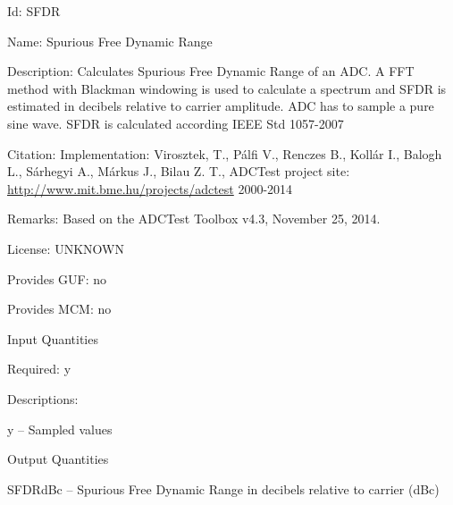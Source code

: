 \begin{tightdesc}
\item [Id:] SFDR
\item [Name:] Spurious Free Dynamic Range
\item [Description:] Calculates Spurious Free Dynamic Range of an ADC. A FFT method with Blackman windowing is used to calculate a spectrum and SFDR is estimated in decibels relative to carrier amplitude. ADC has to sample a pure sine wave. SFDR is calculated according IEEE Std 1057-2007
\item [Citation:] Implementation: Virosztek, T., Pálfi V., Renczes B., Kollár I., Balogh L., Sárhegyi A., Márkus J., Bilau Z. T., ADCTest project site: \url{http://www.mit.bme.hu/projects/adctest} 2000-2014
\item [Remarks:] Based on the ADCTest Toolbox v4.3, November 25, 2014.
\item [License:] UNKNOWN
\item [Provides GUF:] no
\item [Provides MCM:] no
\item [Input Quantities] \rule{0em}{0em}
    \begin{tightdesc}
    \item [Required:] 
        \textsf{y}
    \end{tightdesc}
\item [Descriptions:] \rule{0em}{0em}
    \begin{tightdesc}
        \item[\textsf{y}] -- Sampled values
    \end{tightdesc}
\item [Output Quantities] \rule{0em}{0em}
    \begin{tightdesc}
        \item[\textsf{SFDRdBc}] -- Spurious Free Dynamic Range in decibels relative to carrier (dBc)
    \end{tightdesc}
\end{tightdesc}
